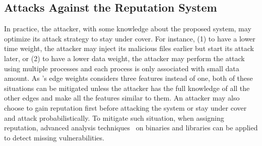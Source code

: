 \subsection{Attacks Against the Reputation System}
In practice, the attacker, with some knowledge about the proposed system, may optimize its attack strategy to stay under cover. For instance, (1) to have a lower time weight, the attacker may inject its malicious files earlier but start its attack later, or (2) to have a lower data weight, the attacker may perform the attack using multiple processes and each process is only associated with small data amount.
As \tool's edge weights considers three features instead of one, both of these situations can be mitigated unless the attacker has the full knowledge of all the other edges and make all the features similar to them.
An attacker may also choose to gain reputation first before attacking the system or stay under cover and attack probabilistically. 
To mitigate such situation, when assigning reputation, advanced analysis techniques~\cite{driller,binverify} on binaries and libraries can be applied to detect missing vulnerabilities.








